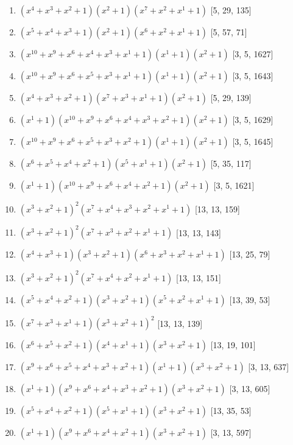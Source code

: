 \documentclass[10pt,twocolumn]{article}
\begin{document}
\begin{enumerate}
\item $(x^{4} + x^{3} + x^{2} + 1)(x^{2} + 1)(x^{7} + x^{2} + x^{1} + 1)$  [5, 29, 135]
\item $(x^{5} + x^{4} + x^{3} + 1)(x^{2} + 1)(x^{6} + x^{2} + x^{1} + 1)$  [5, 57, 71]
\item $(x^{10} + x^{9} + x^{6} + x^{4} + x^{3} + x^{1} + 1)(x^{1} + 1)(x^{2} + 1)$  [3, 5, 1627]
\item $(x^{10} + x^{9} + x^{6} + x^{5} + x^{3} + x^{1} + 1)(x^{1} + 1)(x^{2} + 1)$  [3, 5, 1643]
\item $(x^{4} + x^{3} + x^{2} + 1)(x^{7} + x^{3} + x^{1} + 1)(x^{2} + 1)$  [5, 29, 139]
\item $(x^{1} + 1)(x^{10} + x^{9} + x^{6} + x^{4} + x^{3} + x^{2} + 1)(x^{2} + 1)$  [3, 5, 1629]
\item $(x^{10} + x^{9} + x^{6} + x^{5} + x^{3} + x^{2} + 1)(x^{1} + 1)(x^{2} + 1)$  [3, 5, 1645]
\item $(x^{6} + x^{5} + x^{4} + x^{2} + 1)(x^{5} + x^{1} + 1)(x^{2} + 1)$  [5, 35, 117]
\item $(x^{1} + 1)(x^{10} + x^{9} + x^{6} + x^{4} + x^{2} + 1)(x^{2} + 1)$  [3, 5, 1621]
\item $(x^{3} + x^{2} + 1)^{2}(x^{7} + x^{4} + x^{3} + x^{2} + x^{1} + 1)$  [13, 13, 159]
\item $(x^{3} + x^{2} + 1)^{2}(x^{7} + x^{3} + x^{2} + x^{1} + 1)$  [13, 13, 143]
\item $(x^{4} + x^{3} + 1)(x^{3} + x^{2} + 1)(x^{6} + x^{3} + x^{2} + x^{1} + 1)$  [13, 25, 79]
\item $(x^{3} + x^{2} + 1)^{2}(x^{7} + x^{4} + x^{2} + x^{1} + 1)$  [13, 13, 151]
\item $(x^{5} + x^{4} + x^{2} + 1)(x^{3} + x^{2} + 1)(x^{5} + x^{2} + x^{1} + 1)$  [13, 39, 53]
\item $(x^{7} + x^{3} + x^{1} + 1)(x^{3} + x^{2} + 1)^{2}$  [13, 13, 139]
\item $(x^{6} + x^{5} + x^{2} + 1)(x^{4} + x^{1} + 1)(x^{3} + x^{2} + 1)$  [13, 19, 101]
\item $(x^{9} + x^{6} + x^{5} + x^{4} + x^{3} + x^{2} + 1)(x^{1} + 1)(x^{3} + x^{2} + 1)$  [3, 13, 637]
\item $(x^{1} + 1)(x^{9} + x^{6} + x^{4} + x^{3} + x^{2} + 1)(x^{3} + x^{2} + 1)$  [3, 13, 605]
\item $(x^{5} + x^{4} + x^{2} + 1)(x^{5} + x^{1} + 1)(x^{3} + x^{2} + 1)$  [13, 35, 53]
\item $(x^{1} + 1)(x^{9} + x^{6} + x^{4} + x^{2} + 1)(x^{3} + x^{2} + 1)$  [3, 13, 597]

\end{enumerate}
\end{document}
